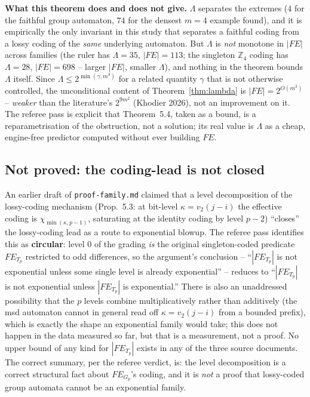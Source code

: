 \documentclass[11pt]{article}
\begin{document}
\textbf{What this theorem does and does not give.} $\Lambda$ separates the extremes
($4$ for the faithful group automaton, $74$ for the densest $m=4$ example found), and it
is empirically the only invariant in this study that separates a faithful coding from a
lossy coding of the \emph{same} underlying automaton. But $\Lambda$ is \emph{not}
monotone in $|FE|$ across families (the ruler has $\Lambda=35$, $|FE|=113$; the singleton
$\mathbb Z_4$ coding has $\Lambda=28$, $|FE|=698$ -- larger $|FE|$, smaller $\Lambda$),
and nothing in the theorem bounds $\Lambda$ itself. Since $\Lambda\le2^{\min(\gamma,m^3)}$
for a related quantity $\gamma$ that is not otherwise controlled, the unconditional
content of Theorem~\ref{thm:lambda} is $|FE| = 2^{O(m^3)}$ -- \emph{weaker} than the
literature's $2^{9m^2}$ (Khodier 2026), not an improvement on it. The referee pass is
explicit that Theorem~5.4, taken as a bound, is a reparametrisation of the obstruction,
not a solution; its real value is $\Lambda$ as a cheap, engine-free predictor computed
without ever building $FE$.

\subsection{Not proved: the coding-lead is not closed}

An earlier draft of \texttt{proof-family.md} claimed that a level decomposition of the
lossy-coding mechanism (Prop.\ 5.3: at bit-level $\kappa=v_2(j-i)$ the effective coding is
$\chi_{\min(\kappa,p-1)}$, saturating at the identity coding by level $p-2$) ``closes''
the lossy-coding lead as a route to exponential blowup. The referee pass identifies this
as \textbf{circular}: level $0$ of the grading \emph{is} the original singleton-coded
predicate $FE_{T_p}$ restricted to odd differences, so the argument's conclusion --
``$|FE_{T_p}|$ is not exponential unless some single level is already exponential'' --
reduces to ``$|FE_{T_p}|$ is not exponential unless $|FE_{T_p}|$ is exponential.'' There
is also an unaddressed possibility that the $p$ levels combine multiplicatively rather
than additively (the msd automaton cannot in general read off $\kappa=v_2(j-i)$ from a
bounded prefix), which is exactly the shape an exponential family would take; this does
not happen in the data measured so far, but that is a measurement, not a proof. No upper
bound of any kind for $|FE_{T_p}|$ exists in any of the three source documents. The
correct summary, per the referee verdict, is: the level decomposition is a correct
structural fact about $FE_{G_p}$'s coding, and it is \emph{not} a proof that lossy-coded
group automata cannot be an exponential family.
\end{document}

